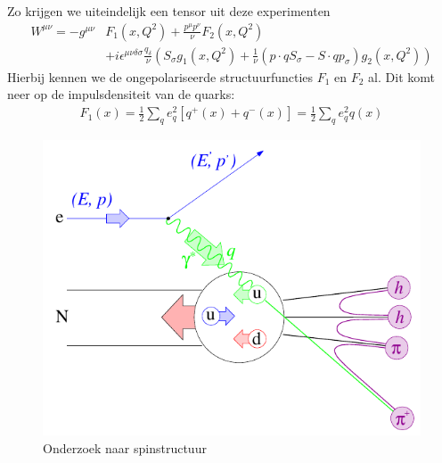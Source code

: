 \documentclass[../main.tex]{subfiles}
\begin{document}
Zo krijgen we uiteindelijk een tensor uit deze experimenten
\begin{equation}
    \begin{aligned}
        \label{eq:pol_tensor}
        W^{\mu\nu} = -g^{\mu\nu}&F_1(x,Q^2) + \frac{p^\mu p^\nu}{\nu} F_2(x,Q^2)\\
        &+ i\epsilon^{\mu\nu\delta\sigma} \frac{q_\delta}{\nu} (S_\sigma g_1(x,Q^2) + \frac{1}{\nu} (p\cdot qS_\sigma - S\cdot qp_\sigma)g_2(x,Q^2))
    \end{aligned}
\end{equation}
Hierbij kennen we de ongepolariseerde structuurfuncties $F_1$ en $F_2$ al. Dit komt neer op de impulsdensiteit van de quarks:
\begin{equation}
    \begin{aligned}
        \label{eq:f_1_pol}
        F_1(x)=\frac{1}{2} \sum_q e_q^2[q^+(x)+q^-(x)] = \frac{1}{2} \sum_q e_q^2 q(x)
    \end{aligned}
\end{equation}

\begin{figure}[t!]
    \centering
    \includegraphics[width=0.6\linewidth]{DIS_nucleon_structuur_pdf/foton_abs.png}
    \caption{Onderzoek naar spinstructuur}%
    \label{fig:foton_abs}
\end{figure}
\end{document}

